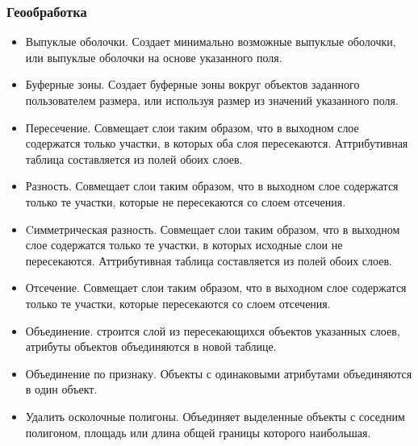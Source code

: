 \begin{frame}[allowframebreaks]
    \frametitle{Геообработка}
    \begin{itemize}
        \item Выпуклые оболочки. Создает минимально возможные выпуклые оболочки, или выпуклые оболочки на основе указанного поля.
        \item Буферные зоны. Создает буферные зоны вокруг объектов заданного пользователем размера, или используя размер из значений указанного поля.
        \item Пересечение. Совмещает слои таким образом, что в выходном слое содержатся только участки, в которых оба слоя пересекаются. Аттрибутивная таблица составляется из полей обоих слоев.
        \item Разность. Совмещает слои таким образом, что в выходном слое содержатся только те участки, которые не пересекаются со слоем отсечения.
        \item Cимметрическая разность. Совмещает слои таким образом, что в выходном слое содержатся только те участки, в которых исходные слои не пересекаются. Аттрибутивная таблица составляется из полей обоих слоев.
        \item Отсечение. Совмещает слои таким образом, что в выходном слое содержатся только те участки, которые пересекаются со слоем отсечения.
        \item Объединение. строится слой из пересекающихся объектов указанных слоев, атрибуты объектов объединяются в новой таблице.
        \item Объединение по признаку. Объекты с одинаковыми атрибутами объединяются в один объект.
        \item Удалить осколочные полигоны. Объединяет выделенные объекты с соседним полигоном, площадь или длина общей границы которого наибольшая.
    \end{itemize}
\end{frame}

